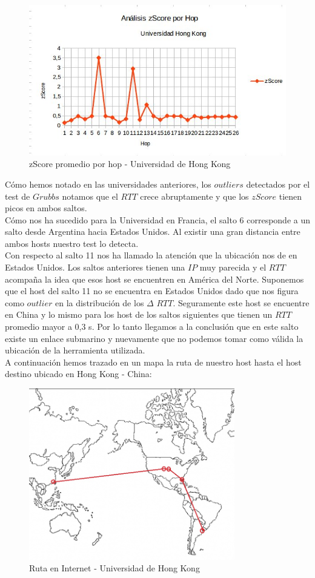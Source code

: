 \begin{figure}[H]
\centering
\includegraphics[width=1\textwidth]{graficos/zScore_HongKong.jpg}
\caption{zScore promedio por hop - Universidad de Hong Kong}
\label{hongkong_zs}
\end{figure}

Cómo hemos notado en las universidades anteriores, los $outliers$ detectados por el test de $Grubbs$ notamos que el $RTT$ crece abruptamente y que los $zScore$ tienen 
picos en ambos saltos.\\

Cómo nos ha sucedido para la Universidad en Francia, el salto 6 corresponde a un salto desde Argentina hacia Estados Unidos. Al existir una gran distancia entre ambos hosts 
nuestro test lo detecta.\\

Con respecto al salto 11 nos ha llamado la atención que la ubicación nos de en Estados Unidos. Los saltos anteriores tienen una $IP$ muy parecida y el $RTT$ acompaña la idea
que esos host se encuentren en América del Norte. Suponemos que el host del salto 11 no se encuentra en Estados Unidos dado que nos figura como $outlier$ en la distribución de 
los $\Delta$ $RTT$. Seguramente este host se encuentre en China y lo mismo para los host de los saltos siguientes que tienen un $RTT$ promedio mayor a 0,3 s. Por lo tanto
llegamos a la conclusión que en este salto existe un enlace submarino y nuevamente que no podemos tomar como válida la ubicación de la herramienta utilizada.\\

A continuación hemos trazado en un mapa la ruta de nuestro host hasta el host destino ubicado en Hong Kong - China:
\begin{figure}[H]
\centering
\includegraphics[width=0.8\textwidth]{graficos/mapa_hongKong.jpg}
\caption{Ruta en Internet - Universidad de Hong Kong}
\label{hongkong_zs}
\end{figure}
